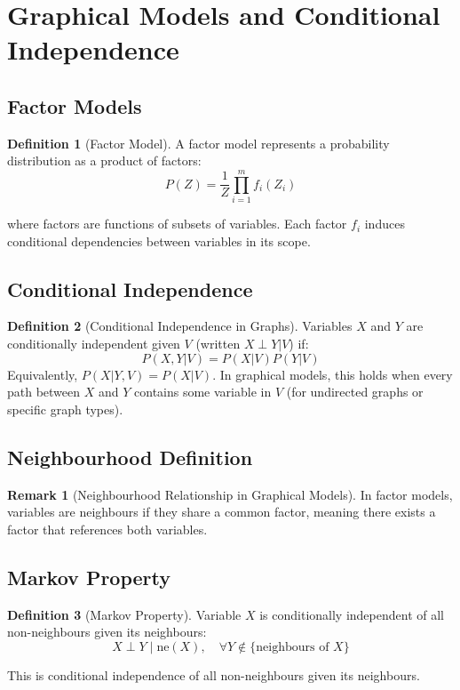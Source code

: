 \documentclass[12pt,a4paper]{article}
\theoremstyle{definition}
\newtheorem{definition}{Definition}[section]
\newtheorem{remark}{Remark}[section]
\begin{document}
\newpage

\section{Graphical Models and Conditional Independence}

\subsection{Factor Models}

\begin{definition}[Factor Model]
A factor model represents a probability distribution as a product of factors:
\[
P(Z) = \frac{1}{Z} \prod_{i=1}^m f_i(Z_i)
\]

where factors are functions of subsets of variables. Each factor $f_i$ induces conditional dependencies between variables in its scope.
\end{definition}

\subsection{Conditional Independence}

\begin{definition}[Conditional Independence in Graphs]
Variables $X$ and $Y$ are conditionally independent given $V$ (written $X \perp Y | V$) if:
\[
P(X, Y | V) = P(X | V) P(Y | V)
\]
Equivalently, $P(X | Y, V) = P(X | V)$. In graphical models, this holds when every path between $X$ and $Y$ contains some variable in $V$ (for undirected graphs or specific graph types).
\end{definition}

\subsection{Neighbourhood Definition}

\begin{remark}[Neighbourhood Relationship in Graphical Models]
In factor models, variables are neighbours if they share a common factor, meaning there exists a factor that references both variables.
\end{remark}

\subsection{Markov Property}

\begin{definition}[Markov Property]
Variable $X$ is conditionally independent of all non-neighbours given its neighbours:
\[
X \perp Y \mid \text{ne}(X), \quad \forall Y \notin \{\text{neighbours of } X\}
\]

This is conditional independence of all non-neighbours given its neighbours.
\end{definition}
\end{document}
